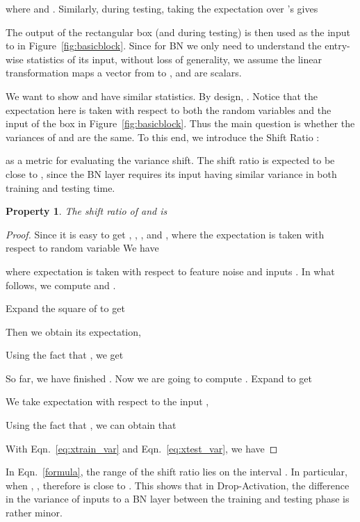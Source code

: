 \documentclass[11pt]{article}
\newtheorem{property}[theorem]{Property}
\begin{document}
where  and . Similarly, during testing, taking the expectation over 's gives

The output of the rectangular box  (and  during testing) is then used as the input to  in Figure~\ref{fig:basicblock}. Since for BN we only need to understand the entry-wise statistics of its input, without loss of generality, we assume the linear transformation  maps a vector from  to ,  and  are scalars.

We want to show  and  have similar statistics. By design, . Notice that the expectation here is taken with respect to both the random variables  and the input  of the box in Figure~\ref{fig:basicblock}. Thus the main question is whether the variances of  and  are the same. To this end, we introduce the Shift Ratio \cite{BNandDropout}:

 as a metric for evaluating the variance shift. The shift ratio is expected to be close to , since the BN layer  requires its input having similar variance in both training and testing time.
\begin{property}
The shift ratio of  and  is

\label{prop2}
\vspace{-0.5cm}
\end{property}

\begin{proof}
Since  it is easy to get
, , , and ,
where the expectation is taken with respect to random variable 
We have

 where expectation is taken with respect to feature noise  and inputs . In what follows, we compute  and .

Expand the square of  to get


Then we obtain its expectation,


Using the fact that , we get


So far, we have finished . Now we are going to compute . Expand  to get


We take expectation with respect to the input ,


Using the fact that , we can obtain that


With Eqn.~\ref{eq:xtrain_var} and Eqn.~\ref{eq:xtest_var}, we have

\end{proof}

In Eqn.~\eqref{formula}, the range of the shift ratio lies on the interval . In particular, when , , therefore  is close to . This shows that in Drop-Activation, the difference in the variance of inputs to a BN layer between the training and testing phase is rather minor.
\end{document}
